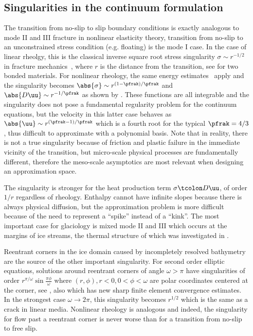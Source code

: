 \subsection{Singularities in the continuum formulation}
The transition from no-slip to slip boundary conditions is exactly analogous to mode II and III fracture in nonlinear elasticity theory, transition from no-slip to an unconstrained stress condition (e.g. floating) is the mode I case.
In the case of linear rheolgy, this is the classical inverse square root stress singularity $\sigma \sim r^{-1/2}$ in fracture mechanics~\citep{anderson2005fracture}, where $r$ is the distance from the transition, see \citet{erdogan1973two} for two bonded materials.
For nonlinear rheology, the same energy estimates~\citep{rice1968path} apply and the singularity becomes $\abs{\sigma} \sim r^{(1-\pfrak)/\pfrak}$ and $\abs{D\uu} \sim r^{-1/\pfrak}$ as shown by \citet{rice1968plane,hutchinson1968singular}. 
These functions are all integrable and the singularity does not pose a fundamental regularity problem for the continuum equations, but the velocity in this latter case behaves as $\abs{\uu} \sim r^{(\pfrak-1)/\pfrak}$ which is a fourth root for the typical $\pfrak = 4/3$, thus difficult to approximate with a polynomial basis.
Note that in reality, there is not a true singularity because of friction and plastic failure in the immediate vicinity of the transition, but micro-scale physical processes are fundamentally different, therefore the meso-scale asymptotics are most relevant when designing an approximation space.

The singularity is stronger for the heat production term $\sigma\tcolon D\uu$, of order $1/r$ regardless of rheology.
Enthalpy cannot have infinite slopes because there is always physical diffusion, but the approximation problem is more difficult because of the need to represent a ``spike'' instead of a ``kink''.
The most important case for glaciology is mixed mode II and III which occurs at the margins of ice streams, the thermal structure of which was investigated in \citet{jacobson1998thermal,raymond2000energy}.

Reentrant corners in the ice domain caused by incompletely resolved bathymetry are the source of the other important singularity.
For second order elliptic equations, solutions around reentrant corners of angle $\omega > \pi$ have singularities of order $r^{\pi/\omega}\sin\frac{\pi\phi}{\omega}$ where $(r,\phi), r < 0, 0 < \phi < \omega$ are polar coordinates centered at the corner, see \citet{grisvard1985elliptic,nazarov1994elliptic}, also \citet{bacuta2003regularity} which has new sharp finite element convergence estimates.
In the strongest case $\omega\to 2\pi$, this singularity becomes $r^{1/2}$ which is the same as a crack in linear media.
Nonlinear rheology is analogous and indeed, the singularity for flow past a reentrant corner is never worse than for a transition from no-slip to free slip.

